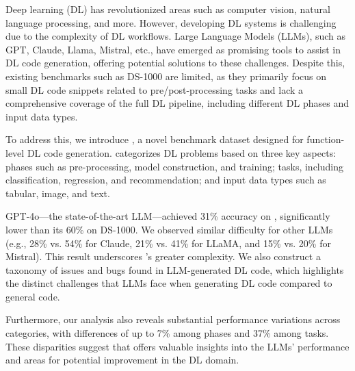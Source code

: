 Deep learning (DL) has revolutionized 
areas such as computer vision, natural language processing, and more. However, developing DL systems is challenging due to
the complexity of DL workflows. Large Language Models (LLMs), such as GPT, Claude, Llama, Mistral, etc., have emerged as promising tools to assist in DL code generation, offering potential solutions to these challenges. Despite this, existing benchmarks such as DS-1000 are limited, as they primarily focus on small DL code snippets related to pre/post-processing tasks and lack a comprehensive coverage of the full DL pipeline, including different DL phases and input data types.

To address this, we introduce \tool, a novel benchmark dataset designed for function-level DL code generation. \tool categorizes DL problems based on three key aspects: phases such as pre-processing, model construction, and training; tasks, including classification, regression, and recommendation; and input data types such as tabular, image, and text. 

GPT-4o---the state-of-the-art LLM---achieved 31\% accuracy on \tool, significantly lower than its 60\% on DS-1000. We observed similar difficulty for other LLMs (e.g., 28\% vs. 54\% for Claude, 21\% vs. 41\% for LLaMA, and 15\% vs. 20\% for Mistral). This result underscores \tool's greater complexity. We also construct a taxonomy of issues and bugs found in LLM-generated DL code, which highlights the distinct challenges that LLMs face when generating DL code compared to general code.

Furthermore, our analysis also reveals substantial performance variations across categories, with differences of up to 7\% among phases and 37\% among tasks. These disparities suggest that \tool offers valuable insights into the LLMs' performance and areas for potential improvement in the DL domain. 

